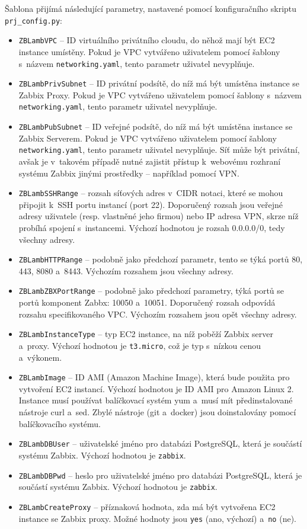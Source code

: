 \documentclass[czech, ing, kiv, he, iso690]{fasthesis}
\begin{document}
Šablona přijímá následující parametry, nastavené pomocí konfiguračního skriptu \verb|prj_config.py|:

\begin{itemize}
    \item \verb|ZBLambVPC| -- ID virtuálního privátního cloudu, do něhož mají být EC2 instance umístěny. Pokud je VPC vytvářeno uživatelem pomocí šablony s~názvem \verb|networking.yaml|, tento parametr uživatel nevyplňuje.
    \item \verb|ZBLambPrivSubnet| -- ID privátní podsítě, do níž má být umístěna instance se Zabbix Proxy. Pokud je VPC vytvářeno uživatelem pomocí šablony s~názvem \verb|networking.yaml|, tento parametr uživatel nevyplňuje.
    \item \verb|ZBLambPubSubnet| -- ID veřejné podsítě, do níž má být umístěna instance se Zabbix Serverem. Pokud je VPC vytvářeno uživatelem pomocí šablony \verb|networking.yaml|, tento parametr uživatel nevyplňuje. Síť může být privátní, avšak je v~takovém případě nutné zajistit přístup k~webovému rozhraní systému Zabbix jinými prostředky -- například pomocí VPN.
    \item \verb|ZBLambSSHRange| -- rozsah síťových adres v~CIDR notaci, které se mohou připojit k~SSH portu instancí (port 22). Doporučený rozsah jsou veřejné adresy uživatele (resp. vlastněné jeho firmou) nebo IP adresa VPN, skrze níž probíhá spojení s~instancemi. Výchozí hodnotou je rozsah 0.0.0.0/0, tedy všechny adresy.
    \item \verb|ZBLambHTTPRange| -- podobně jako předchozí parametr, tento se týká portů 80, 443, 8080 a~8443. Výchozím rozsahem jsou všechny adresy.
    \item \verb|ZBLambZBXPortRange| -- podobně jako předchozí parametry, týká portů se portů komponent Zabbx: 10050 a~10051. Doporučený rozsah odpovídá rozsahu specifikovaného VPC. Výchozím rozsahem jsou opět všechny adresy.
    \item \verb|ZBLambInstanceType| -- typ EC2 instance, na níž poběží Zabbix server a~proxy. Výchozí hodnotou je \verb|t3.micro|, což je typ s~nízkou cenou a~výkonem.
    \item \verb|ZBLambImage| -- ID AMI (Amazon Machine Image), která bude použita pro vytvoření EC2 instancí. Výchozí hodnotou je ID AMI pro Amazon Linux 2. Instance musí používat balíčkovací systém yum a~musí mít předinstalované nástroje curl a~sed. Zbylé nástroje (git a~docker) jsou doinstalovány pomocí balíčkovacího systému.
    \item \verb|ZBLambDBUser| -- uživatelské jméno pro databázi PostgreSQL, která je součástí systému Zabbix. Výchozí hodnotou je \verb|zabbix|.
    \item \verb|ZBLambDBPwd| -- heslo pro uživatelské jméno pro databázi PostgreSQL, která je součástí systému Zabbix. Výchozí hodnotou je \verb|zabbix|.
    \item \verb|ZBLambCreateProxy| -- příznaková hodnota, zda má být vytvořena EC2 instance se Zabbix proxy. Možné hodnoty jsou \verb|yes| (ano, výchozí) a~\verb|no| (ne).
\end{itemize}
\end{document}
